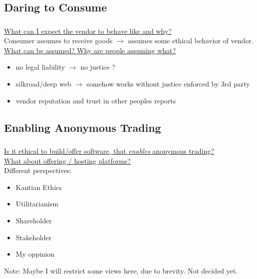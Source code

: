 \subsection{Daring to Consume}
\begin{frame}
    \frametitle{\insertsubsection}
    \underline{What can I expect the vendor to behave like and why?}\\
    \vspace{.8em}
    Consumer assumes to receive goods $\rightarrow$ assumes some ethical behavior of vendor.\\
    \vspace{1em}
    \underline{What can be assumed? Why are people assuming what?}
    \vspace{.8em}
    \begin{itemize}
        \itemsep\setlength{.8em}
        \item no legal liability $\rightarrow$ no justice ?%
        \item silkroad/deep web $\rightarrow$ somehow works without justice enforced by 3rd party
        \item vendor reputation and trust in other peoples reports
    \end{itemize}
\end{frame}

\subsection{Enabling Anonymous Trading}
\begin{frame}
    \frametitle{\insertsubsection}
    \vspace{.4em}
    \underline{Is it ethical to build/offer software, that \emph{enables} anonymous trading?}\\
    \vspace{1em}
    \underline{What about offering / hosting platforms?}\\
    \vspace{1em}
    Different perspectives:\\
    \begin{itemize}
        \itemsep\setlength{.8em}
        \item Kantian Ethics
        \item Utilitarianism
        \item Shareholder
        \item Stakeholder
        \item My oppinion
    \end{itemize}
    Note: Maybe I will restrict some views here, due to brevity. Not decided yet.
\end{frame}